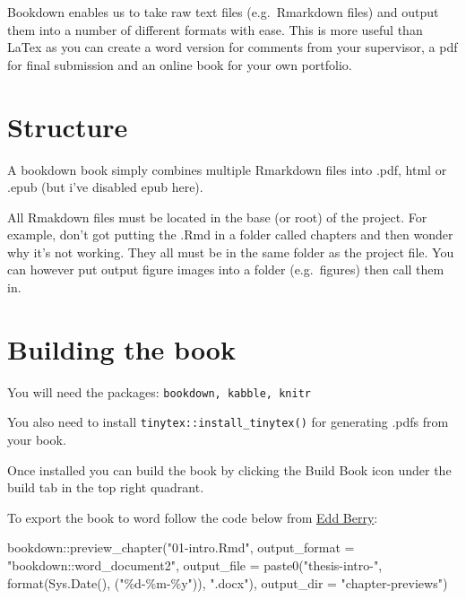 \documentclass[
  12pt,
  oneside]{book}
\newenvironment{Shaded}{\begin{snugshade}}{\end{snugshade}}
\newcommand{\AttributeTok}[1]{\textcolor[rgb]{0.77,0.63,0.00}{#1}}
\newcommand{\FunctionTok}[1]{\textcolor[rgb]{0.00,0.00,0.00}{#1}}
\newcommand{\NormalTok}[1]{#1}
\newcommand{\SpecialCharTok}[1]{\textcolor[rgb]{0.00,0.00,0.00}{#1}}
\newcommand{\StringTok}[1]{\textcolor[rgb]{0.31,0.60,0.02}{#1}}
\begin{document}

Bookdown enables us to take raw text files (e.g.~Rmarkdown files) and output them into a number of different formats with ease. This is more useful than LaTex as you can create a word version for comments from your supervisor, a pdf for final submission and an online book for your own portfolio.

\hypertarget{structure}{%
\section{Structure}\label{structure}}

A bookdown book simply combines multiple Rmarkdown files into .pdf, html or .epub (but i've disabled epub here).

All Rmakdown files must be located in the base (or root) of the project. For example, don't got putting the .Rmd in a folder called chapters and then wonder why it's not working. They all must be in the same folder as the project file. You can however put output figure images into a folder (e.g.~figures) then call them in.

\hypertarget{building-the-book}{%
\section{Building the book}\label{building-the-book}}

You will need the packages: \texttt{bookdown,\ kabble,\ knitr}

You also need to install \texttt{tinytex::install\_tinytex()} for generating .pdfs from your book.

Once installed you can build the book by clicking the Build Book icon under the build tab in the top right quadrant.

To export the book to word follow the code below from \href{https://www.eddjberry.com/post/writing-your-thesis-with-bookdown/}{Edd Berry}:

\begin{Shaded}
\begin{Highlighting}[]
\NormalTok{bookdown}\SpecialCharTok{::}\FunctionTok{preview\_chapter}\NormalTok{(}\StringTok{"01{-}intro.Rmd"}\NormalTok{,}
                \AttributeTok{output\_format =} \StringTok{"bookdown::word\_document2"}\NormalTok{,}
                \AttributeTok{output\_file =} \FunctionTok{paste0}\NormalTok{(}\StringTok{"thesis{-}intro{-}"}\NormalTok{, }
                                     \FunctionTok{format}\NormalTok{(}\FunctionTok{Sys.Date}\NormalTok{(), }
\NormalTok{                                            (}\StringTok{"\%d{-}\%m{-}\%y"}\NormalTok{)), }
                                     \StringTok{".docx"}\NormalTok{),}
                \AttributeTok{output\_dir =} \StringTok{"chapter{-}previews"}\NormalTok{)}
\end{Highlighting}
\end{Shaded}
\end{document}

